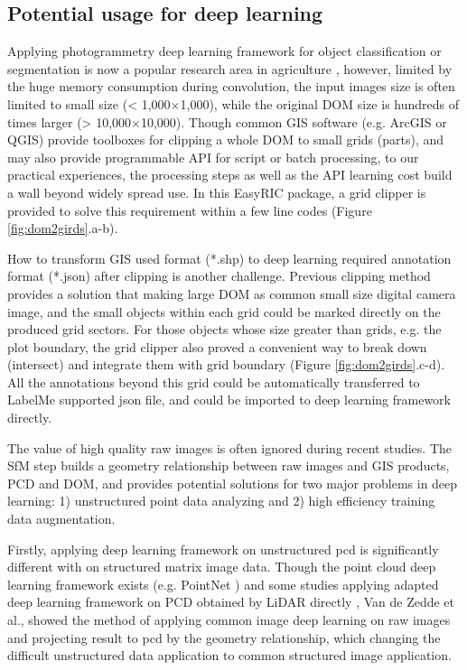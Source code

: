 \documentclass{configs/bmcart}
\begin{document}
\subsection*{Potential usage for deep learning}
Applying photogrammetry deep learning framework for object classification or segmentation is now a popular research area in agriculture \cite{zhou_fast_2020, feng_evaluation_2020, desai_automatic_2019}, however, limited by the huge memory consumption during convolution, the input images size is often limited to small size (< 1,000$\times$1,000), while the original DOM size is hundreds of times larger (> 10,000$\times$10,000). Though common GIS software (e.g. ArcGIS or QGIS) provide toolboxes for clipping a whole DOM to small grids (parts), and may also provide programmable API for script or batch processing, to our practical experiences, the processing steps as well as the API learning cost build a wall beyond widely spread use. In this EasyRIC package, a grid clipper is provided to solve this requirement within a few line codes (Figure \ref{fig:dom2girds}.a-b).

How to transform GIS used format (*.shp) to deep learning required annotation format (*.json) after clipping is another challenge. Previous clipping method provides a solution that making large DOM as common small size digital camera image, and the small objects within each grid could be marked directly on the produced grid sectors. For those objects whose size greater than grids, e.g. the plot boundary, the grid clipper also proved a convenient way to break down (intersect) and integrate them with grid boundary (Figure \ref{fig:dom2girds}.c-d). All the annotations beyond this grid could be automatically transferred to LabelMe supported json file, and could be imported to deep learning framework directly.

The value of high quality raw images is often ignored during recent studies. The SfM step builds a geometry relationship between raw images and GIS products, PCD and DOM, and provides potential solutions for two major problems in deep learning: 1) unstructured point data analyzing and 2) high efficiency training data augmentation.

Firstly, applying deep learning framework on unstructured \acrshort*{pcd} is significantly different with on structured matrix image data. Though the point cloud deep learning framework exists (e.g. PointNet \cite{qi_pointnet_2017}) and some studies applying adapted deep learning framework on PCD obtained by LiDAR directly \cite{jin_deep_2018, jin_stemleaf_2019, jin_non-destructive_2020}, Van de Zedde et al., \cite{van_plant-part_2019} showed the method of applying common image deep learning on raw images and projecting result to \acrshort*{pcd} by the geometry relationship, which changing the difficult unstructured data application to common structured image application.
\end{document}
